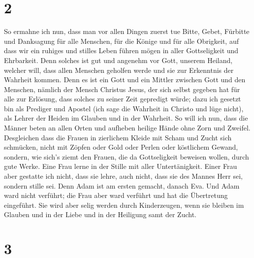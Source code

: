\hypertarget{section-1}{%
\section{2}\label{section-1}}

 So ermahne ich nun, dass man vor allen Dingen zuerst tue
Bitte, Gebet, Fürbitte und Danksagung für alle Menschen, 
für die Könige und für alle Obrigkeit, auf dass wir ein ruhiges und
stilles Leben führen mögen in aller Gottseligkeit und Ehrbarkeit.
 Denn solches ist gut und angenehm vor Gott, unserem
Heiland,  welcher will, dass allen Menschen geholfen werde
und sie zur Erkenntnis der Wahrheit kommen.  Denn es ist
ein Gott und ein Mittler zwischen Gott und den Menschen, nämlich der
Mensch Christus Jesus,  der sich selbst gegeben hat für
alle zur Erlösung, dass solches zu seiner Zeit gepredigt würde;
 dazu ich gesetzt bin als Prediger und Apostel (ich sage
die Wahrheit in Christo und lüge nicht), als Lehrer der Heiden im
Glauben und in der Wahrheit.  So will ich nun, dass die
Männer beten an allen Orten und aufheben heilige Hände ohne Zorn und
Zweifel.  Desgleichen dass die Frauen in zierlichem Kleide
mit Scham und Zucht sich schmücken, nicht mit Zöpfen oder Gold oder
Perlen oder köstlichem Gewand,  sondern, wie sich's ziemt
den Frauen, die da Gottseligkeit beweisen wollen, durch gute Werke.
 Eine Frau lerne in der Stille mit aller Untertänigkeit.
 Einer Frau aber gestatte ich nicht, dass sie lehre, auch
nicht, dass sie des Mannes Herr sei, sondern stille sei. 
Denn Adam ist am ersten gemacht, danach Eva.  Und Adam
ward nicht verführt; die Frau aber ward verführt und hat die Übertretung
eingeführt.  Sie wird aber selig werden durch
Kinderzeugen, wenn sie bleiben im Glauben und in der Liebe und in der
Heiligung samt der Zucht.

\hypertarget{section-2}{%
\section{3}\label{section-2}}

